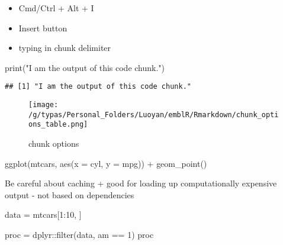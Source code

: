 \documentclass[
]{article}
\newenvironment{Shaded}{\begin{snugshade}}{\end{snugshade}}
\newcommand{\AttributeTok}[1]{\textcolor[rgb]{0.77,0.63,0.00}{#1}}
\newcommand{\DecValTok}[1]{\textcolor[rgb]{0.00,0.00,0.81}{#1}}
\newcommand{\FunctionTok}[1]{\textcolor[rgb]{0.00,0.00,0.00}{#1}}
\newcommand{\NormalTok}[1]{#1}
\newcommand{\OtherTok}[1]{\textcolor[rgb]{0.56,0.35,0.01}{#1}}
\newcommand{\SpecialCharTok}[1]{\textcolor[rgb]{0.00,0.00,0.00}{#1}}
\newcommand{\StringTok}[1]{\textcolor[rgb]{0.31,0.60,0.02}{#1}}
\providecommand{\tightlist}{%
  \setlength{\itemsep}{0pt}\setlength{\parskip}{0pt}}
\begin{document}
\begin{itemize}
\tightlist
\item
  Cmd/Ctrl + Alt + I
\item
  Insert button
\item
  typing in chunk delimiter
\end{itemize}

\begin{Shaded}
\begin{Highlighting}[]
\FunctionTok{print}\NormalTok{(}\StringTok{"I am the output of this code chunk."}\NormalTok{)}
\end{Highlighting}
\end{Shaded}

\begin{verbatim}
## [1] "I am the output of this code chunk."
\end{verbatim}

\begin{figure}
\centering
\texttt{[image: /g/typas/Personal\_Folders/Luoyan/emblR/Rmarkdown/chunk\_options\_table.png]}
\caption{chunk options}
\end{figure}

\begin{Shaded}
\begin{Highlighting}[]
\FunctionTok{ggplot}\NormalTok{(mtcars, }\FunctionTok{aes}\NormalTok{(}\AttributeTok{x =}\NormalTok{ cyl, }\AttributeTok{y =}\NormalTok{ mpg)) }\SpecialCharTok{+} 
  \FunctionTok{geom\_point}\NormalTok{()}
\end{Highlighting}
\end{Shaded}

Be careful about caching + good for loading up computationally expensive
output - not based on dependencies

\begin{Shaded}
\begin{Highlighting}[]
\NormalTok{data }\OtherTok{=}\NormalTok{ mtcars[}\DecValTok{1}\SpecialCharTok{:}\DecValTok{10}\NormalTok{, ]}
\end{Highlighting}
\end{Shaded}

\begin{Shaded}
\begin{Highlighting}[]
\NormalTok{proc }\OtherTok{=}\NormalTok{ dplyr}\SpecialCharTok{::}\FunctionTok{filter}\NormalTok{(data, am }\SpecialCharTok{==} \DecValTok{1}\NormalTok{)}
\NormalTok{proc}
\end{Highlighting}
\end{Shaded}
\end{document}
